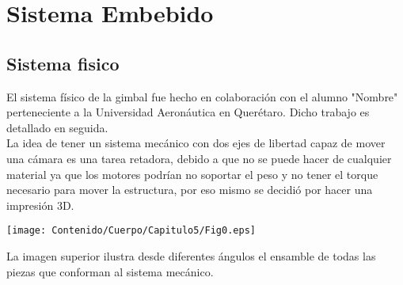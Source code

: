 \chapter{Sistema Embebido}

\section{Sistema fisico}
El sistema físico de la gimbal fue hecho en colaboración con el alumno "Nombre" perteneciente
a la Universidad Aeronáutica en Querétaro. Dicho trabajo es detallado en seguida.\\
La idea de tener un sistema mecánico con dos ejes de libertad capaz de mover una cámara
es una tarea retadora, debido a que no se puede hacer de cualquier material ya que
los motores podrían no soportar el peso y no tener el torque necesario para mover la
estructura, por eso mismo se decidió por hacer una impresión 3D.
\begin{center}
	\texttt{[image: Contenido/Cuerpo/Capitulo5/Fig0.eps]}
	\label{Fig1}
\end{center}
La imagen superior ilustra desde diferentes ángulos el ensamble de todas las piezas que
conforman al sistema mecánico.